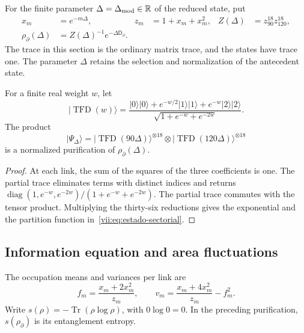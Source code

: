 For the finite parameter \(\Delta=\Delta_{\rm mod}\in\mathbb R\) of the
reduced state, put
\begin{align}
 x_m&=e^{-m\Delta},& z_m&=1+x_m+x_m^2,&
 Z(\Delta)&=z_{90}^{18}z_{120}^{18},\\
 \rho_\partial(\Delta)&=Z(\Delta)^{-1}e^{-\Delta\mathsf D_\partial}.
 \label{vii:eq:estado-sectorial}
\end{align}
The trace in this section is the ordinary matrix trace, and the states
have trace one. The parameter \(\Delta\) retains the selection and
normalization of the antecedent state.

\begin{proposition}
\label{vii:prop:purificacion-sectorial}
For a finite real weight \(w\), let
\begin{equation}
 |\operatorname{TFD}(w)\rangle
 =\frac{|0\rangle|0\rangle+e^{-w/2}|1\rangle|1\rangle
                   +e^{-w}|2\rangle|2\rangle}
        {\sqrt{1+e^{-w}+e^{-2w}}}.
 \label{vii:eq:tfd-local}
\end{equation}
The product
\begin{equation}
 |\Psi_\Delta\rangle
 =|\operatorname{TFD}(90\Delta)\rangle^{\otimes18}
  \otimes|\operatorname{TFD}(120\Delta)\rangle^{\otimes18}
 \label{vii:eq:tfd-sectorial}
\end{equation}
is a normalized purification of \(\rho_\partial(\Delta)\).
\end{proposition}
\begin{proof}
At each link, the sum of the squares of the three coefficients is one.
The partial trace eliminates terms with distinct indices and returns
\(\operatorname{diag}(1,e^{-w},e^{-2w})/(1+e^{-w}+e^{-2w})\).
The partial trace commutes with the tensor product. Multiplying the
thirty-six reductions gives the exponential and the partition function
in~\eqref{vii:eq:estado-sectorial}.
\end{proof}

\subsection{Information equation and area fluctuations}
\label{vii:subsec:ecuacion-informacional}

The occupation means and variances per link are
\begin{equation}
 f_m=\frac{x_m+2x_m^2}{z_m},\qquad
 v_m=\frac{x_m+4x_m^2}{z_m}-f_m^2.
 \label{vii:eq:momentos-sectoriales}
\end{equation}
Write \(s(\rho)=-\operatorname{Tr}(\rho\log\rho)\), with
\(0\log0=0\). In the preceding purification, \(s(\rho_\partial)\)
is its entanglement entropy.


